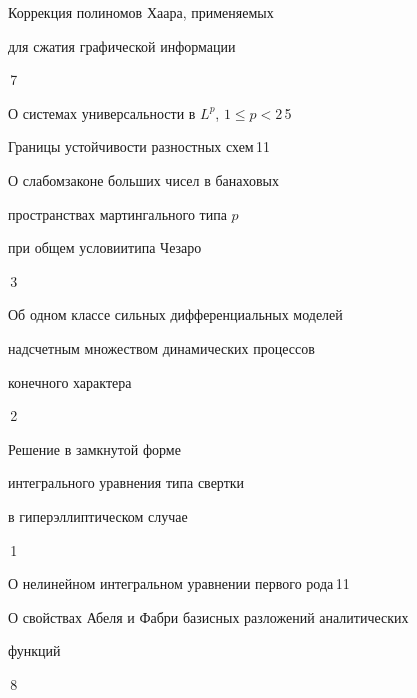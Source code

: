 

{Коррекция полиномов Хаара, применяемых \newline


для сжатия графической информации}{\No\,7}




{О системах универсальности в $L^p$, $1\le p<2$}{\No\,5}




{Границы устойчивости разностных схем}{\No\,11}






{О слабом\newline законе больших чисел в банаховых


пространствах мартингального типа $p$ 


при общем условии\newline типа Чезаро}{\No\,3}




{Об одном классе сильных дифференциальных моделей  


над\newline счетным множеством динамических процессов  


конечного характера}{\No\,2}




{Решение в замкнутой форме 


интегрального уравнения типа свертки\newline


в гиперэллиптическом случае}{\No\,1}




{О нелинейном интегральном уравнении первого рода}{\No\,11}




{О свойствах Абеля и Фабри базисных разложений аналитических \newline


функций}{\No\,8}



